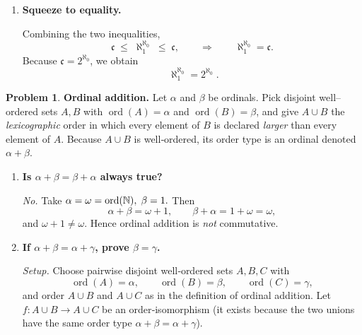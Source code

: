 \documentclass[12pt]{article}
\theoremstyle{definition} %
\newtheorem{problem}{Problem}
\theoremstyle{plain} %
\begin{document}
\begin{enumerate}
\item \textbf{Squeeze to equality.}

      Combining the two inequalities,
      \[
          \mathfrak c
          \;\le\;
          \aleph_{1}^{\aleph_{0}}
          \;\le\;
          \mathfrak c,
      \qquad\Longrightarrow\qquad
          \aleph_{1}^{\aleph_{0}}=\mathfrak c.
      \]
      Because $\mathfrak c=2^{\aleph_{0}}$, we obtain
      \[
          \boxed{\;
            \aleph_{1}^{\aleph_{0}} = 2^{\aleph_{0}}\;}.
      \]
      \qedhere
\end{enumerate}

\begin{problem}
    \textbf{Ordinal addition.}\;
    Let $\alpha$ and $\beta$ be ordinals.  
    Pick disjoint well–ordered sets $A,B$ with
    $\operatorname{ord}(A)=\alpha$ and $\operatorname{ord}(B)=\beta$,
    and give $A\cup B$ the \emph{lexicographic} order in which every
    element of $B$ is declared \emph{larger} than every element of $A$.
    Because $A\cup B$ is well‑ordered, its order type is an ordinal
    denoted $\alpha+\beta$.

    \begin{enumerate}
    \item \textbf{Is $\alpha+\beta=\beta+\alpha$ always true?}

          \emph{No.}  
          Take
          \(
             \alpha=\omega=\operatorname{ord}(\Bbb N),\;
             \beta=1.
          \)
          Then
          \[
              \alpha+\beta
              =\omega+1,
              \qquad
              \beta+\alpha
              =1+\omega
              =\omega,
          \]
          and $\omega+1\neq\omega$.  Hence ordinal addition is
          \emph{not} commutative.

    \item \textbf{If $\alpha+\beta=\alpha+\gamma$, prove $\beta=\gamma$.}

          \smallskip
          \emph{Setup.}\;
          Choose pairwise disjoint well‑ordered sets
          $A,B,C$ with
          \[
              \operatorname{ord}(A)=\alpha,\qquad
              \operatorname{ord}(B)=\beta,\qquad
              \operatorname{ord}(C)=\gamma,
          \]
          and order $A\cup B$ and $A\cup C$ as in the definition of
          ordinal addition.  
          Let
          \(
              f:A\cup B\to A\cup C
          \)
          be an order‑isomorphism (it exists because the two unions have
          the same order type $\alpha+\beta=\alpha+\gamma$).


\end{enumerate}
\end{problem}
\end{document}
